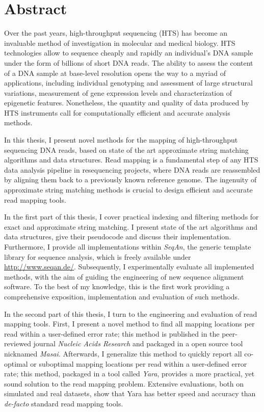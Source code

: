 \section*{Abstract}
\label{sec:abstract:en}

Over the past years, high-throughput sequencing (HTS) has become an invaluable method of investigation in molecular  and medical biology.
HTS technologies allow to sequence cheaply and rapidly an individual's DNA sample under the form of billions of short DNA reads.
The ability to assess the content of a DNA sample at base-level resolution opens the way to a myriad of applications, including individual genotyping and assessment of large structural variations, measurement of gene expression levels and characterization of epigenetic features.
Nonetheless, the quantity and quality of data produced by HTS instruments call for computationally efficient and accurate analysis methods.

In this thesis, I present novel methods for the mapping of high-throughput sequencing DNA reads, based on state of the art approximate string matching algorithms and data structures.
Read mapping is a fundamental step of any HTS data analysis pipeline in resequencing projects, where DNA reads are reassembled by aligning them back to a previously known reference genome.
The ingenuity of approximate string matching methods is crucial to design efficient and accurate read mapping tools.

In the first part of this thesis, I cover practical indexing and filtering methods for exact and approximate string matching.
I present state of the art algorithms and data structures, give their pseudocode and discuss their implementation.
Furthermore, I provide all implementations within \emph{SeqAn}, the generic \CC template library for sequence analysis, which is freely available under \url{http://www.seqan.de/}.
Subsequently, I experimentally evaluate all implemented methods, with the aim of guiding the engineering of new sequence alignment software.
To the best of my knowledge, this is the first work providing a comprehensive exposition, implementation and evaluation of such methods.

In the second part of this thesis, I turn to the engineering and evaluation of read mapping tools.
First, I present a novel method to find all mapping locations per read within a user-defined error rate;
this method is published in the peer-reviewed journal \emph{Nucleic Acids Research} and packaged in a open source tool nicknamed \emph{Masai}.
Afterwards, I generalize this method to quickly report all co-optimal or suboptimal mapping locations per read within a user-defined error rate;
this method, packaged in a tool called \emph{Yara}, provides a more practical, yet sound solution to the read mapping problem.
Extensive evaluations, both on simulated and real datasets, show that Yara has better speed and accuracy than \emph{de-facto} standard read mapping tools.

\newpage
